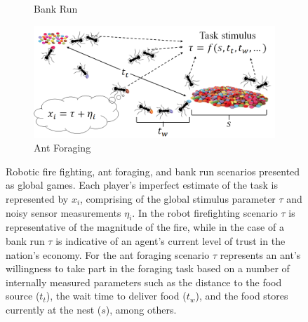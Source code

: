 \documentclass[12pt]{article}
\begin{document}
\begin{figure}[ht!]
\begin{subfigure}[t]{0.41\textwidth}
        \caption{Bank Run}
    \end{subfigure}
    \begin{subfigure}[t]{.82\textwidth}
        \centering
        \includegraphics[width=1\textwidth]{figures/foraging.png}
        \caption{Ant Foraging}
    \end{subfigure}    
    \caption{Robotic fire fighting, ant foraging, and bank run scenarios presented as global games. Each player's imperfect estimate of the task is represented by $x_i$, comprising of the global stimulus parameter $\tau$ and noisy sensor measurements $\eta_i$. In the robot firefighting scenario $\tau$ is representative of the magnitude of the fire, while in the case of a bank run $\tau$ is indicative of an agent's current level of trust in the nation's economy. For the ant foraging scenario $\tau$ represents an ant's willingness to take part in the foraging task based on a number of internally measured parameters such as the distance to the food source ($t_t$), the wait time to deliver food ($t_w$), and the food stores currently at the nest ($s$), among others.
}    
\end{figure}
\end{document}
